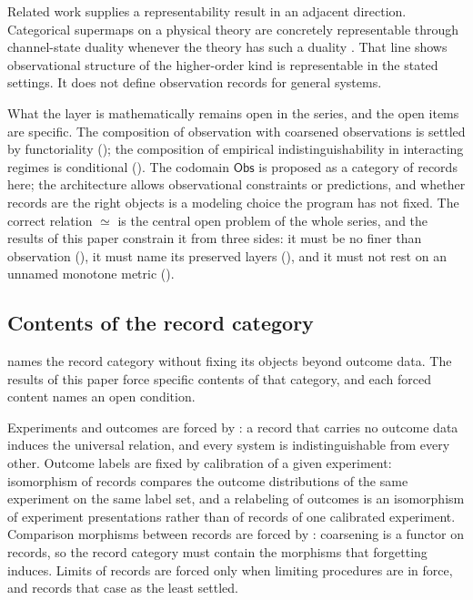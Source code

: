 \documentclass[11pt,letterpaper]{article}
\theoremstyle{definition}
\theoremstyle{remark}
\begin{document}
Related work supplies a representability result in an adjacent direction. Categorical supermaps on a physical theory are concretely representable through channel-state duality whenever the theory has such a duality \cite{b5,b9}. That line shows observational structure of the higher-order kind is representable in the stated settings. It does not define observation records for general systems.

What the layer is mathematically remains open in the series, and the open items are specific. The composition of observation with coarsened observations is settled by functoriality (); the composition of empirical indistinguishability in interacting regimes is conditional (). The codomain $\mathsf{Obs}$ is proposed as a category of records here; the architecture allows observational constraints or predictions, and whether records are the right objects is a modeling choice the program has not fixed. The correct relation $\simeq$ is the central open problem of the whole series, and the results of this paper constrain it from three sides: it must be no finer than observation (), it must name its preserved layers (), and it must not rest on an unnamed monotone metric ().

\subsection{Contents of the record category}

 names the record category without fixing its objects beyond outcome data. The results of this paper force specific contents of that category, and each forced content names an open condition.

Experiments and outcomes are forced by : a record that carries no outcome data induces the universal relation, and every system is indistinguishable from every other. Outcome labels are fixed by calibration of a given experiment: isomorphism of records compares the outcome distributions of the same experiment on the same label set, and a relabeling of outcomes is an isomorphism of experiment presentations rather than of records of one calibrated experiment. Comparison morphisms between records are forced by : coarsening is a functor on records, so the record category must contain the morphisms that forgetting induces. Limits of records are forced only when limiting procedures are in force, and  records that case as the least settled.
\end{document}
